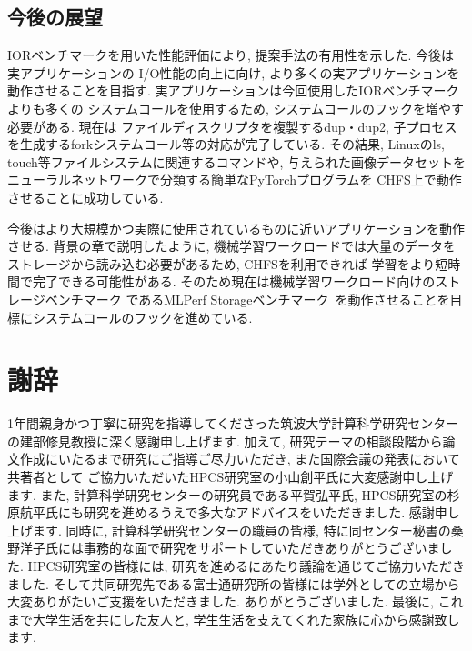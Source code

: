 \documentclass[a4paper,11pt]{jreport}
\begin{document}
\section{今後の展望}
IORベンチマークを用いた性能評価により, 提案手法の有用性を示した. 今後は実アプリケーションの
I/O性能の向上に向け, より多くの実アプリケーションを動作させることを目指す. 実アプリケーションは今回使用したIORベンチマークよりも多くの
システムコールを使用するため, システムコールのフックを増やす必要がある. 現在は
ファイルディスクリプタを複製するdup・dup2, 子プロセスを生成するforkシステムコール等の対応が完了している. その結果, Linuxのls, 
touch等ファイルシステムに関連するコマンドや, 与えられた画像データセットをニューラルネットワークで分類する簡単なPyTorchプログラムを
CHFS上で動作させることに成功している. 

今後はより大規模かつ実際に使用されているものに近いアプリケーションを動作させる. 
背景の章で説明したように, 機械学習ワークロードでは大量のデータをストレージから読み込む必要があるため, CHFSを利用できれば
学習をより短時間で完了できる可能性がある. そのため現在は機械学習ワークロード向けのストレージベンチマーク
であるMLPerf Storageベンチマーク~\cite{mlperfstorage}を動作させることを目標にシステムコールのフックを進めている. 

\chapter*{謝辞}
1年間親身かつ丁寧に研究を指導してくださった筑波大学計算科学研究センターの建部修見教授に深く感謝申し上げます. 
加えて, 研究テーマの相談段階から論文作成にいたるまで研究にご指導ご尽力いただき, また国際会議の発表において共著者として
ご協力いただいたHPCS研究室の小山創平氏に大変感謝申し上げます. 
また, 計算科学研究センターの研究員である平賀弘平氏, HPCS研究室の杉原航平氏にも研究を進めるうえで多大なアドバイスをいただきました. 感謝申し上げます. 
同時に, 計算科学研究センターの職員の皆様, 特に同センター秘書の桑野洋子氏には事務的な面で研究をサポートしていただきありがとうございました. 
HPCS研究室の皆様には, 研究を進めるにあたり議論を通じてご協力いただきました. 
そして共同研究先である富士通研究所の皆様には学外としての立場から大変ありがたいご支援をいただきました. ありがとうございました. 
最後に, これまで大学生活を共にした友人と, 学生生活を支えてくれた家族に心から感謝致します. 

\newpage

\renewcommand{\bibname}{参考文献}



\end{document}
